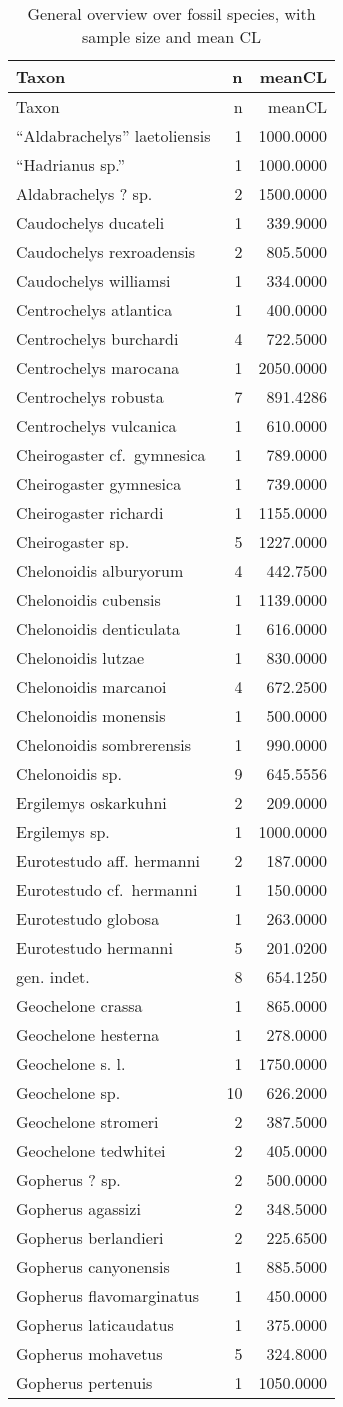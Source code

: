 \begin{longtable}[]{@{}lrr@{}}
	\caption{General overview over fossil species, with sample size and mean
		CL}
	\label{tab:Species}\tabularnewline
	\toprule
	Taxon & n & meanCL\tabularnewline
	\midrule
	\endfirsthead
	\toprule
	Taxon & n & meanCL\tabularnewline
	\midrule
	\endhead
	``Aldabrachelys'' laetoliensis & 1 & 1000.0000\tabularnewline
	``Hadrianus sp.'' & 1 & 1000.0000\tabularnewline
	Aldabrachelys ? sp. & 2 & 1500.0000\tabularnewline
	Caudochelys ducateli & 1 & 339.9000\tabularnewline
	Caudochelys rexroadensis & 2 & 805.5000\tabularnewline
	Caudochelys williamsi & 1 & 334.0000\tabularnewline
	Centrochelys atlantica & 1 & 400.0000\tabularnewline
	Centrochelys burchardi & 4 & 722.5000\tabularnewline
	Centrochelys marocana & 1 & 2050.0000\tabularnewline
	Centrochelys robusta & 7 & 891.4286\tabularnewline
	Centrochelys vulcanica & 1 & 610.0000\tabularnewline
	Cheirogaster cf.~gymnesica & 1 & 789.0000\tabularnewline
	Cheirogaster gymnesica & 1 & 739.0000\tabularnewline
	Cheirogaster richardi & 1 & 1155.0000\tabularnewline
	Cheirogaster sp. & 5 & 1227.0000\tabularnewline
	Chelonoidis alburyorum & 4 & 442.7500\tabularnewline
	Chelonoidis cubensis & 1 & 1139.0000\tabularnewline
	Chelonoidis denticulata & 1 & 616.0000\tabularnewline
	Chelonoidis lutzae & 1 & 830.0000\tabularnewline
	Chelonoidis marcanoi & 4 & 672.2500\tabularnewline
	Chelonoidis monensis & 1 & 500.0000\tabularnewline
	Chelonoidis sombrerensis & 1 & 990.0000\tabularnewline
	Chelonoidis sp. & 9 & 645.5556\tabularnewline
	Ergilemys oskarkuhni & 2 & 209.0000\tabularnewline
	Ergilemys sp. & 1 & 1000.0000\tabularnewline
	Eurotestudo aff. hermanni & 2 & 187.0000\tabularnewline
	Eurotestudo cf.~hermanni & 1 & 150.0000\tabularnewline
	Eurotestudo globosa & 1 & 263.0000\tabularnewline
	Eurotestudo hermanni & 5 & 201.0200\tabularnewline
	gen. indet. & 8 & 654.1250\tabularnewline
	Geochelone crassa & 1 & 865.0000\tabularnewline
	Geochelone hesterna & 1 & 278.0000\tabularnewline
	Geochelone s. l. & 1 & 1750.0000\tabularnewline
	Geochelone sp. & 10 & 626.2000\tabularnewline
	Geochelone stromeri & 2 & 387.5000\tabularnewline
	Geochelone tedwhitei & 2 & 405.0000\tabularnewline
	Gopherus ? sp. & 2 & 500.0000\tabularnewline
	Gopherus agassizi & 2 & 348.5000\tabularnewline
	Gopherus berlandieri & 2 & 225.6500\tabularnewline
	Gopherus canyonensis & 1 & 885.5000\tabularnewline
	Gopherus flavomarginatus & 1 & 450.0000\tabularnewline
	Gopherus laticaudatus & 1 & 375.0000\tabularnewline
	Gopherus mohavetus & 5 & 324.8000\tabularnewline
	Gopherus pertenuis & 1 & 1050.0000\tabularnewline

\end{longtable}
